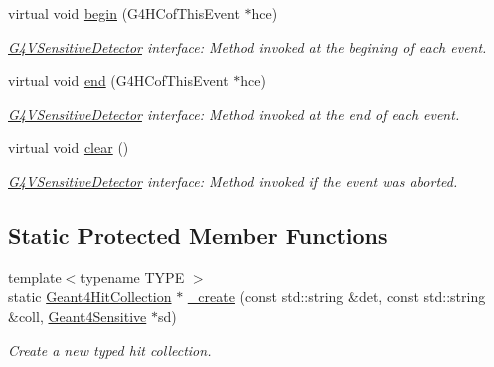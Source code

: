 \begin{DoxyCompactItemize}
virtual void \hyperlink{class_d_d4hep_1_1_simulation_1_1_geant4_sens_det_action_sequence_a59c1e52c811f9385da294c0b18704ab1}{begin} (G4HCofThisEvent $\ast$hce)
\begin{DoxyCompactList}\small\item\em \hyperlink{class_g4_v_sensitive_detector}{G4VSensitiveDetector} interface: Method invoked at the begining of each event. \item\end{DoxyCompactList}\item 
virtual void \hyperlink{class_d_d4hep_1_1_simulation_1_1_geant4_sens_det_action_sequence_a2b7944c785413b2a479f4ba4ad2e1515}{end} (G4HCofThisEvent $\ast$hce)
\begin{DoxyCompactList}\small\item\em \hyperlink{class_g4_v_sensitive_detector}{G4VSensitiveDetector} interface: Method invoked at the end of each event. \item\end{DoxyCompactList}\item 
virtual void \hyperlink{class_d_d4hep_1_1_simulation_1_1_geant4_sens_det_action_sequence_ab2bab9282950af33d3e14e3f0d5864fd}{clear} ()
\begin{DoxyCompactList}\small\item\em \hyperlink{class_g4_v_sensitive_detector}{G4VSensitiveDetector} interface: Method invoked if the event was aborted. \item\end{DoxyCompactList}\end{DoxyCompactItemize}
\subsection*{Static Protected Member Functions}
\begin{DoxyCompactItemize}
\item 
{\footnotesize template$<$typename TYPE $>$ }\\static \hyperlink{class_d_d4hep_1_1_simulation_1_1_geant4_hit_collection}{Geant4HitCollection} $\ast$ \hyperlink{class_d_d4hep_1_1_simulation_1_1_geant4_sens_det_action_sequence_a1620735a4aa22fb041c0a8b31893bfe1}{\_\-create} (const std::string \&det, const std::string \&coll, \hyperlink{class_d_d4hep_1_1_simulation_1_1_geant4_sensitive}{Geant4Sensitive} $\ast$sd)
\begin{DoxyCompactList}\small\item\em Create a new typed hit collection. \item\end{DoxyCompactList}\end{DoxyCompactItemize}
